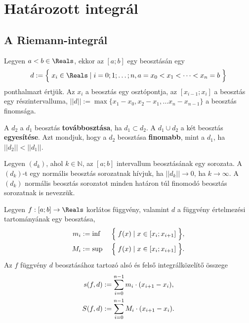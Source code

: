 \clearpage
\section{Határozott integrál}\label{section.7.4}

\subsection{A Riemann-integrál}

\begin{definition}
  Legyen $a < b \in \Reals$, ekkor az $[a;b]$ egy beosztásán egy
  \[
    d := \Big\{ \;
    x_i \in \Reals
    \; | \;
    i = 0; 1; \dots; n,
    a = x_0 < x_1 < \dots < x_n  = b
    \; \Big\}
  \]
  ponthalmazt értjük. Az $x_i$ a beosztás egy osztópontja, az $[x_{i - 1}; x_i]$
  a beosztás egy részintervalluma, $||d|| := \max \{x_1 - x_0, x_2 - x_1, \dots
    x_n - x_{n-1} \}$ a beosztás finomsága.
\end{definition}

\begin{note}
  A $d_2$ a $d_1$ beosztás \textbf{továbbosztása}, ha $d_1 \subset d_2$. A $d_1
    \cup d_2$ a két beosztás \textbf{egyesítése}. Azt mondjuk, hogy a $d_2$
  beosztása \textbf{finomabb}, mint a $d_1$, ha $||d_2|| < ||d_1||$.
\end{note}

\begin{note}
  Legyen $(d_k)$, ahol $k \in \mathbb N$, az $[a; b]$ intervallum beosztásának
  egy sorozata. A $(d_k)$-t egy normális beosztás sorozatnak hívjuk, ha $||d_k||
    \rightarrow 0$, ha $k \rightarrow \infty$. A $(d_k)$ normális beosztás sorozatot
  minden határon túl finomodó beosztás sorozatnak is nevezzük.
\end{note}

\begin{definition}
  Legyen $f: [a;b] \rightarrow \Reals$ korlátos függvény, valamint $d$ a
  függvény értelmezési tartományának egy beosztása,
  \begin{alignat*}{9}
    m_i & := \inf & \; & \Big\{\; f(x) \; | \; x \in [x_{i}; x_{i+1}] \;\Big\}
    \text,
    \\
    M_i & := \sup & \; & \Big\{\; f(x) \; | \; x \in [x_{i}; x_{i+1}] \;\Big\}
    \text.
  \end{alignat*}
  Az $f$ függvény $d$ beosztásához tartozó alsó és felső integrálközelítő
  összege
  \begin{align*}
    s(f, d) & := \sum_{i=0}^{n-1} m_i \cdot (x_{i+1} - x_i)
    \text,
    \\
    S(f, d) & := \sum_{i=0}^{n-1} M_i \cdot (x_{i+1} - x_i)
    \text.
  \end{align*}
\end{definition}

